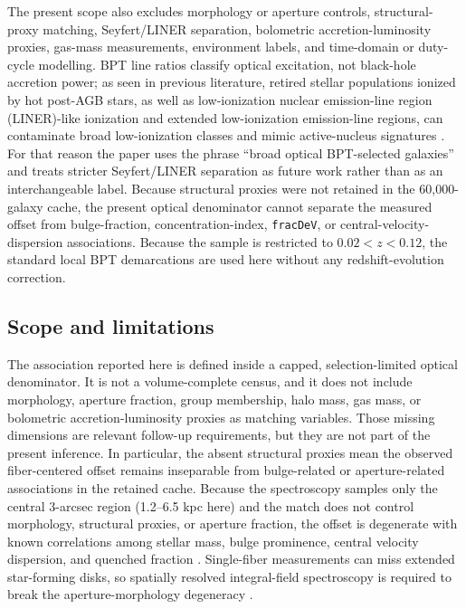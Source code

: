\documentclass[twocolumn]{aastex631}
\begin{document}
The present scope also excludes morphology or aperture controls, structural-proxy matching, Seyfert/LINER separation, bolometric accretion-luminosity proxies, gas-mass measurements, environment labels, and time-domain or duty-cycle modelling. BPT line ratios classify optical excitation, not black-hole accretion power; as seen in previous literature, retired stellar populations ionized by hot post-AGB stars, as well as low-ionization nuclear emission-line region (LINER)-like ionization and extended low-ionization emission-line regions, can contaminate broad low-ionization classes and mimic active-nucleus signatures \citep{cidfernandes2011,stasinska2008,stasinska2015,belfiore2016}. For that reason the paper uses the phrase ``broad optical BPT-selected galaxies'' and treats stricter Seyfert/LINER separation as future work rather than as an interchangeable label. Because structural proxies were not retained in the 60,000-galaxy cache, the present optical denominator cannot separate the measured offset from bulge-fraction, concentration-index, \texttt{fracDeV}, or central-velocity-dispersion associations. Because the sample is restricted to $0.02<z<0.12$, the standard local BPT demarcations are used here without any redshift-evolution correction.

\subsection{Scope and limitations}
The association reported here is defined inside a capped, selection-limited optical denominator. It is not a volume-complete census, and it does not include morphology, aperture fraction, group membership, halo mass, gas mass, or bolometric accretion-luminosity proxies as matching variables. Those missing dimensions are relevant follow-up requirements, but they are not part of the present inference. In particular, the absent structural proxies mean the observed fiber-centered offset remains inseparable from bulge-related or aperture-related associations in the retained cache. Because the spectroscopy samples only the central 3-arcsec region (1.2--6.5 kpc here) and the match does not control morphology, structural proxies, or aperture fraction, the offset is degenerate with known correlations among stellar mass, bulge prominence, central velocity dispersion, and quenched fraction \citep{schawinski2010,bluck2014,piotrowska2022}. Single-fiber measurements can miss extended star-forming disks, so spatially resolved integral-field spectroscopy is required to break the aperture-morphology degeneracy \citep{penny2018,cheung2016,bundy2015}.
\end{document}
